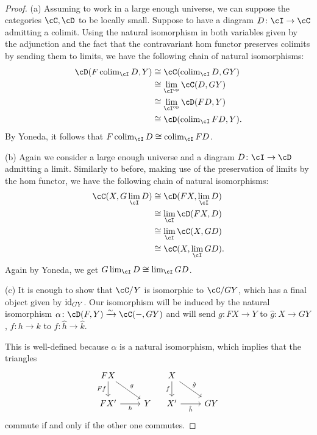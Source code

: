 \documentclass[a4paper,11pt,openany]{scrartcl}
\begin{document}
~\\
\begin{proof}
    (a) Assuming to work in a large enough universe, we can suppose the
    categories $\cC,\cD$ to be locally small. Suppose to have a diagram $D\colon\cI\rightarrow\cC$ admitting a
    colimit. Using the natural isomorphism in both variables given by the
    adjunction and the fact that the contravariant hom functor preserves
    colimits by sending them to limits, we have the following chain of natural
    isomorphisms:
    \begin{align*}
        \cD(F\colim_\cI D,Y) &\cong \cC(\colim_\cI D,GY) \\
        &\cong\lim_{\cI^{\op}}\cC(D,GY) \\
        &\cong\lim_{\cI^{\op}}\cD(FD,Y) \\
        &\cong\cD(\colim_{\cI}FD,Y).
    \end{align*}
    By Yoneda, it follows that $F\colim_\cI D\cong\colim_\cI FD$.

    (b) Again we consider a large enough universe and a diagram
    $D\colon\cI\rightarrow\cD$ admitting a limit. Similarly to before, making
    use of the preservation of limits by the hom functor, we have the following
    chain of natural isomorphisms:
    \begin{align*}
        \cC(X,G\lim_\cI D) &\cong \cD(FX,\lim_\cI D) \\
        &\cong\lim_{\cI}\cD(FX,D) \\
        &\cong\lim_{\cI}\cC(X,GD) \\
        &\cong\cC(X,\lim_\cI GD).
    \end{align*}
    Again by Yoneda, we get $G\lim_\cI D\cong\lim_\cI GD$.

    (c) It is enough to show that $\cC/Y$ is isomorphic to $\cC/GY$, which has a
    final object given by $\operatorname{id}_{GY}$. Our isomorphism will be induced by the
    natural isomorphism $\alpha\colon\cD(F,Y)\xrightarrow{\sim}\cC(-,GY)$ and
    will send $g\colon FX\rightarrow Y$ to $\hat{g}\colon X\rightarrow GY$,
    $f\colon h\rightarrow k$ to $f\colon\hat{h}\rightarrow\hat{k}$.

    This is well-defined because $\alpha$ is a natural isomorphism, which
    implies that the triangles
    \[
        \begin{tikzcd}
            FX\ar[d, "Ff", swap]\ar[dr, "g"] \\
            FX'\ar[r, "h", swap]
            & Y
        \end{tikzcd}
        \quad
        \begin{tikzcd}
            X\ar[d, "f", swap]\ar[dr, "\hat{g}"] \\
            X'\ar[r, "\hat{h}", swap]
            & GY
        \end{tikzcd}
    \]
    commute if and only if the other one commutes.


\end{proof}
\end{document}
